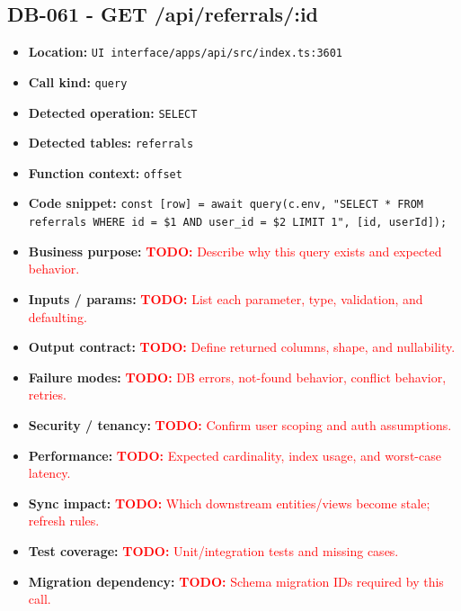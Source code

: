 \documentclass[11pt]{article}
\newcommand{\todoitem}[1]{\textcolor{red}{\textbf{TODO:} #1}}
\begin{document}
\subsection{DB-061 - GET /api/referrals/:id}
\begin{itemize}[leftmargin=1.5em]
\item \textbf{Location:} \texttt{UI interface/apps/api/src/index.ts:3601}
\item \textbf{Call kind:} \texttt{query}
\item \textbf{Detected operation:} \texttt{SELECT}
\item \textbf{Detected tables:} \texttt{referrals}
\item \textbf{Function context:} \texttt{offset}
\item \textbf{Code snippet:} \texttt{const [row] = await query(c.env, "SELECT * FROM referrals WHERE id = \$1 AND user\_id = \$2 LIMIT 1", [id, userId]);}
\item \textbf{Business purpose:} \todoitem{Describe why this query exists and expected behavior.}
\item \textbf{Inputs / params:} \todoitem{List each parameter, type, validation, and defaulting.}
\item \textbf{Output contract:} \todoitem{Define returned columns, shape, and nullability.}
\item \textbf{Failure modes:} \todoitem{DB errors, not-found behavior, conflict behavior, retries.}
\item \textbf{Security / tenancy:} \todoitem{Confirm user scoping and auth assumptions.}
\item \textbf{Performance:} \todoitem{Expected cardinality, index usage, and worst-case latency.}
\item \textbf{Sync impact:} \todoitem{Which downstream entities/views become stale; refresh rules.}
\item \textbf{Test coverage:} \todoitem{Unit/integration tests and missing cases.}
\item \textbf{Migration dependency:} \todoitem{Schema migration IDs required by this call.}
\end{itemize}
\end{document}
